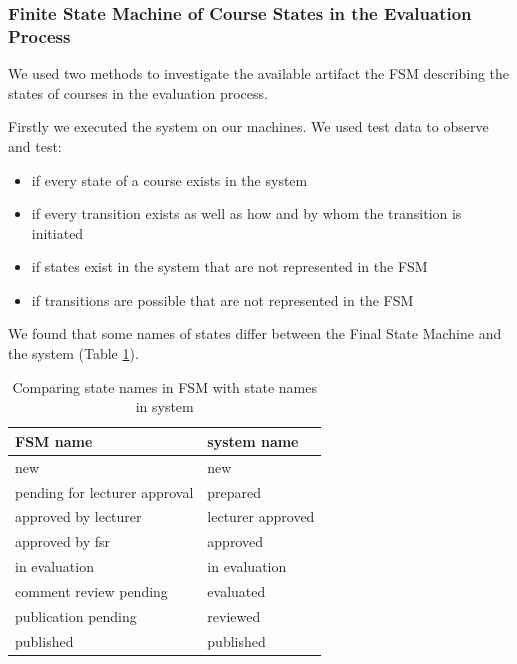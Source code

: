 \subsubsection{Finite State Machine of Course States in the Evaluation Process}
We used two methods to investigate the available artifact the FSM describing the states of courses in the evaluation process.

Firstly we executed the system on our machines.
We used test data to observe and test:
\begin{itemize}
    \item if every state of a course exists in the system
    \item if every transition exists as well as how and by whom the transition is initiated
    \item if states exist in the system that are not represented in the FSM
    \item if transitions are possible that are not represented in the FSM
\end{itemize} 

We found that some names of states differ between the Final State Machine and the system (Table \ref{tab:state-names}).
\begin{table}[]
    \centering
    \label{tab:state-names}
    \begin{tabular}{|l|l|}
        \hline
        FSM name                      & system name       \\ \hline \hline
        new                           & new               \\ \hline
        pending for lecturer approval & prepared          \\ \hline
        approved by lecturer          & lecturer approved \\ \hline
        approved by fsr               & approved          \\ \hline
        in evaluation                 & in evaluation     \\ \hline
        comment review pending        & evaluated         \\ \hline
        publication pending           & reviewed          \\ \hline
        published                     & published         \\ \hline
    \end{tabular}
    \caption{Comparing state names in FSM with state names in system}
\end{table}

